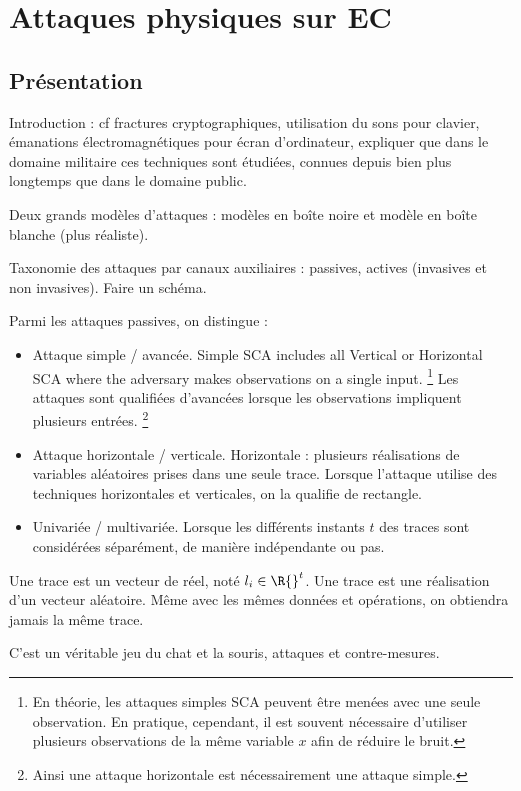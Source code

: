 \chapter{Attaques physiques sur EC}
\section{Présentation}
Introduction : cf fractures cryptographiques, utilisation du sons pour clavier, émanations électromagnétiques pour écran d'ordinateur, expliquer que dans le domaine militaire ces techniques sont étudiées, connues depuis bien plus longtemps que dans le domaine public.

Deux grands modèles d'attaques : modèles en boîte noire et modèle en boîte blanche (plus réaliste). 

Taxonomie des attaques par canaux auxiliaires : passives, actives (invasives et non invasives). Faire un schéma.

Parmi les attaques passives, on distingue :
\begin{itemize}[label=$\bullet$]
    \item Attaque simple / avancée. Simple SCA includes all Vertical or Horizontal SCA where the adversary makes observations on a single input. \footnote{En théorie, les attaques simples SCA peuvent être menées avec une seule observation. En pratique, cependant, il est souvent nécessaire d'utiliser plusieurs observations de la même variable $x$ afin de réduire le bruit.} Les attaques sont qualifiées d'avancées lorsque les observations impliquent plusieurs entrées. \footnote{Ainsi une attaque horizontale est nécessairement une attaque simple.}
    
    \item Attaque horizontale / verticale. Horizontale : plusieurs réalisations de variables aléatoires prises dans une seule trace. Lorsque l'attaque utilise des techniques horizontales et verticales, on la qualifie de rectangle.
    
    \item Univariée / multivariée. Lorsque les différents instants $t$ des traces sont considérées séparément, de manière indépendante ou pas. 
\end{itemize}
Une trace est un vecteur de réel, noté $l_i \in \R{}^t$. Une trace est une réalisation d'un vecteur aléatoire. Même avec les mêmes données et opérations, on obtiendra jamais la même trace. 

C'est un véritable jeu du chat et la souris, attaques et contre-mesures.

